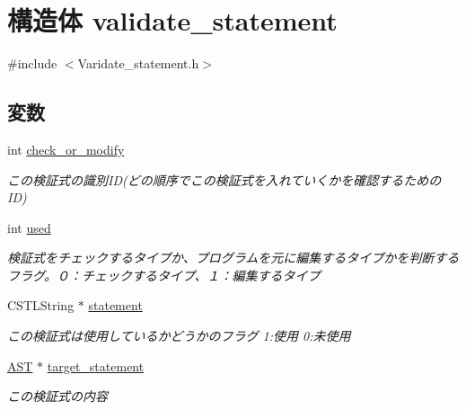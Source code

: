 \hypertarget{structvalidate__statement}{
\section{構造体 validate\_\-statement}
\label{structvalidate__statement}
}


{\ttfamily \#include $<$Varidate\_\-statement.h$>$}

\subsection*{変数}
\begin{DoxyCompactItemize}
\item 
\hypertarget{structvalidate__statement_af811a34ac79801a37cfa0c5ce2f92d48}{
int \hyperlink{structvalidate__statement_af811a34ac79801a37cfa0c5ce2f92d48}{check\_\-or\_\-modify}}
\label{structvalidate__statement_af811a34ac79801a37cfa0c5ce2f92d48}

\begin{DoxyCompactList}\small\item\em この検証式の識別ID(どの順序でこの検証式を入れていくかを確認するためのID) \item\end{DoxyCompactList}\item 
\hypertarget{structvalidate__statement_ad707b113b11d4a04d6950ec7581e52f2}{
int \hyperlink{structvalidate__statement_ad707b113b11d4a04d6950ec7581e52f2}{used}}
\label{structvalidate__statement_ad707b113b11d4a04d6950ec7581e52f2}

\begin{DoxyCompactList}\small\item\em 検証式をチェックするタイプか、プログラムを元に編集するタイプかを判断するフラグ。０：チェックするタイプ、１：編集するタイプ \item\end{DoxyCompactList}\item 
\hypertarget{structvalidate__statement_a2c7d107cd83b73d65b9c6b7919b5f48e}{
CSTLString $\ast$ \hyperlink{structvalidate__statement_a2c7d107cd83b73d65b9c6b7919b5f48e}{statement}}
\label{structvalidate__statement_a2c7d107cd83b73d65b9c6b7919b5f48e}

\begin{DoxyCompactList}\small\item\em この検証式は使用しているかどうかのフラグ 1:使用 0:未使用 \item\end{DoxyCompactList}\item 
\hypertarget{structvalidate__statement_a97f962c68638a36d8d3ef5d52f017f84}{
\hyperlink{structabstract__syntax__tree}{AST} $\ast$ \hyperlink{structvalidate__statement_a97f962c68638a36d8d3ef5d52f017f84}{target\_\-statement}}
\label{structvalidate__statement_a97f962c68638a36d8d3ef5d52f017f84}

\begin{DoxyCompactList}\small\item\em この検証式の内容 \item\end{DoxyCompactList}\end{DoxyCompactItemize}


